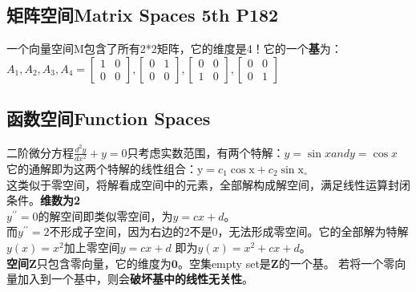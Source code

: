 \documentclass[UTF8]{article}
\begin{document}
    \subsection{矩阵空间Matrix Spaces 5th P182}
    一个向量空间M包含了所有2*2矩阵，它的维度是4！\quad 它的一个\textbf{基}为：
    $A_{1}, A_{2}, A_{3}, A_{4}=\left[\begin{array}{ll}{1} & {0} \\ {0} & {0}\end{array}\right],\left[\begin{array}{ll}{0} & {1} \\ {0} & {0}\end{array}\right],\left[\begin{array}{ll}{0} & {0} \\ {1} & {0}\end{array}\right],\left[\begin{array}{ll}{0} & {0} \\ {0} & {1}\end{array}\right]$

    \subsection{函数空间Function Spaces}
    二阶微分方程$\frac{d^{2} y}{d x^{2}}+y=0$只考虑实数范围，有两个特解：$y=\sin x and y=\cos x$
    \\
    它的通解即为这两个特解的线性组合：$\mathrm{y}=c_{1} \cos \mathrm{x}+c_{2} \sin \mathrm{x}_{\circ}$
    \\
    这类似于零空间，将解看成空间中的元素，全部解构成解空间，满足线性运算封闭条件。\textbf{维数为2}\\
    $y^{\prime \prime}=0$的解空间即类似零空间，为$y=c x+d$。\\
    而$y^{\prime \prime}=2$不形成子空间，因为右边的2不是0，无法形成零空间。它的全部解为特解$y(x)=x^{2}$加上零空间$y=c x+d$
    即为$y(x)=x^{2}+c x+d$。\\
    \textbf{空间}$\bm{Z}$只包含零向量，它的维度为$\bm{0}$。空集empty set是$\bm{Z}$的一个基。
    若将一个零向量加入到一个基中，则会\textbf{破坏基中的线性无关性}。\\
\end{document}
